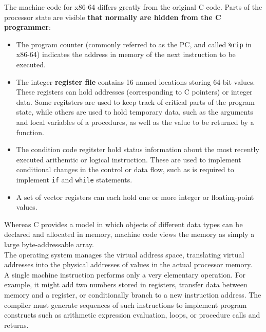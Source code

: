 \documentclass[11pt]{article}
\begin{document}
The machine code for x86-64 differs greatly from the original C code. Parts of the processor state are visible \textbf{that normally are hidden from the C programmer}:\\
\begin{itemize}
\item The program counter (commonly referred to as the PC, and called \texttt{\%rip} in x86-64) indicates the address in memory of the next instruction to be executed.\\
\item The integer \textbf{register file} contains 16 named locations storing 64-bit values. These registers can hold addresses (corresponding to C pointers) or integer data. Some regitsters are used to keep track of critical parts of the program state, while others are used to hold temporary data, such as the arguments and local variables of a procedures, as well as the value to be returned by a function.\\
\item The condition code regitster hold status information about the most recently executed arithemtic or logical instruction. These are used to implement conditional changes in the control or data flow, such as is required to implement \texttt{if} and \texttt{while} statements.\\
\item A set of vector registers can each hold one or more integer or floating-point values.\\
\end{itemize}

Whereas C provides a model in which objects of different data types can be declared and allocated in memory, machine code views the memory as simply a large byte-addressable array.\\

The operating system manages the virtual address space, translating virtual addresses into the physical addresses of values in the actual processor memory.\\


A single machine instruction performs only a very elementary operation. For example, it might add two numbers stored in registers, transfer data between memory and a register, or conditionally branch to a new instruction address. The compiler must generate sequences of such instructions to implement program constructs such as arithmetic expression evaluation, loops, or procedure calls and returns.\\
\end{document}
